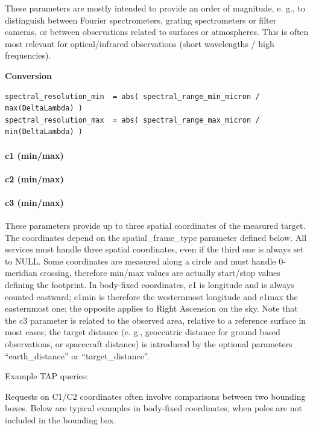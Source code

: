 \documentclass[11pt,a4paper]{ivoa}
\begin{document}
These parameters are mostly intended to provide an order of magnitude, e. g., to distinguish between Fourier spectrometers, grating spectrometers or filter cameras, or between observations related to surfaces or atmospheres. This is often most relevant for optical/infrared observations (short wavelengths / high frequencies).


\textbf{Conversion}

\begin{verbatim}
spectral_resolution_min  = abs( spectral_range_min_micron / max(DeltaLambda) )
spectral_resolution_max  = abs( spectral_range_max_micron / min(DeltaLambda) )
\end{verbatim}

\paragraph{c1 (min/max)}

\paragraph{c2 (min/max)}

\paragraph{c3 (min/max)}

These parameters provide up to three spatial coordinates of the measured target. The coordinates depend on the spatial\_frame\_type parameter defined below. All services must handle three spatial coordinates, even if the third one is always set to NULL. Some coordinates are measured along a circle and must handle 0-meridian crossing, therefore min/max values are actually start/stop values defining the footprint. In body-fixed coordinates, c1 is longitude and is always counted eastward; c1min is therefore the westernmost longitude and c1max the easternmost one; the opposite applies to Right Ascension on the sky. Note that the c3 parameter is related to the observed area, relative to a reference surface in most cases; the target distance (e. g., geocentric distance for ground based observations, or spacecraft distance) is introduced by the optional parameters  ``earth\_distance'' or ``target\_distance''.


Example TAP queries:

Requests on C1/C2 coordinates often involve comparisons between two bounding boxes. Below are typical examples in body-fixed coordinates, when poles are not included in the bounding box.
\end{document}

